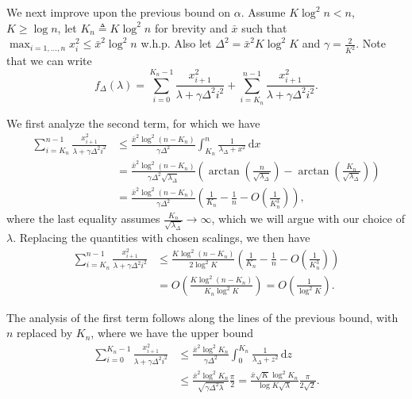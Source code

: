 \documentclass{article}
\def \dx{\, \mathrm{d}}
\begin{document}

We next improve upon the previous bound on $\alpha$.
Assume $K \log^2 n < n$, $K \geq \log n$, let $K_n \triangleq K \log^2 n$ for brevity and $\bar{x}$ such that $\max_{i=1,\ldots,n} x_i^2 \leq \bar{x}^2 \log^2 n$ w.h.p. Also let $\Delta^2 = \bar{x}^2 K \log^2 K$ and $\gamma = \frac{2}{K^2}$. Note that we can write
\[ f_\Delta(\lambda) = \sum_{i=0}^{K_n-1} \frac{x_{i+1}^2}{\lambda + \gamma \Delta^2 i^2} + \sum_{i=K_n}^{n-1} \frac{x_{i+1}^2}{\lambda + \gamma \Delta^2 i^2}. \] 

We first analyze the second term, for which we have
\begin{align*}
  \sum_{i=K_n}^{n-1} \frac{x_{i+1}^2}{\lambda + \gamma \Delta^2 i^2} & \leq \frac{\bar{x}^2 \log^2 (n-K_n)}{\gamma \Delta^2} \int_{K_n}^n \frac{1}{\lambda_\Delta + x^2} \dx x \\
  & = \frac{\bar{x}^2 \log^2 (n-K_n)}{\gamma \Delta^2 \sqrt{\lambda_\Delta}} \left( \arctan \left(\frac{n}{\sqrt{\lambda_\Delta}}\right) - \arctan \left(\frac{K_n}{\sqrt{\lambda_\Delta}}\right) \right) \\
  & = \frac{\bar{x}^2 \log^2 (n-K_n)}{\gamma \Delta^2} \left( \frac{1}{K_n} - \frac{1}{n} - O\left(\frac{1}{K_n^3}\right) \right),
\end{align*}
where the last equality assumes $\frac{K_n}{\sqrt{\lambda_\Delta}} \to \infty$, which we will argue with our choice of $\lambda$. Replacing the quantities with chosen scalings, we then have
\begin{align*}
  \sum_{i=K_n}^{n-1} \frac{x_{i+1}^2}{\lambda + \gamma \Delta^2 i^2} & \leq \frac{K \log^2 (n-K_n)}{2 \log^2 K} \left( \frac{1}{K_n} - \frac{1}{n} - O\left(\frac{1}{K_n^3}\right) \right) \\
  & = O\left( \frac{K \log^2 (n-K_n)}{K_n \log^2 K} \right) = O\left(\frac{1}{\log^2 K}\right).
\end{align*}

The analysis of the first term follows along the lines of the previous bound, with $n$ replaced by $K_n$, where we have the upper bound
\begin{align*}
  \sum_{i=0}^{K_n-1} \frac{x_{i+1}^2}{\lambda + \gamma \Delta^2 i^2} & \leq \frac{\bar{x}^2 \log^2 K_n}{\gamma \Delta^2} \int_0^{K_n} \frac{1}{\lambda_\Delta + z^2} \dx z \\
  & \leq \frac{\bar{x}^2 \log^2 K_n}{\sqrt{\gamma \Delta^2 \lambda}} \frac{\pi}{2} = \frac{\bar{x} \sqrt{K} \log^2 K_n}{\log K \sqrt{\lambda}} \frac{\pi}{2\sqrt{2}}.
\end{align*}
\end{document}
